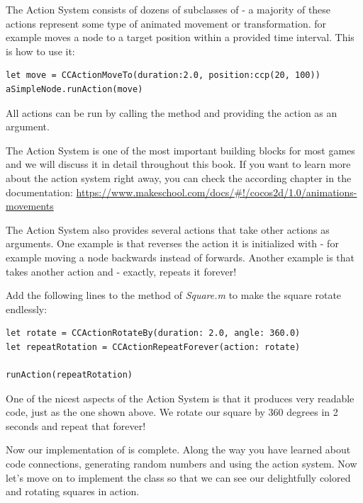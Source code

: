 The Action System consists of
dozens of subclasses of \inlinecode{\ccaction{}} - a majority of these actions represent some type of animated movement or
transformation.  for example moves a node to a
target position within a provided time interval. This is how to use it:
\begin{lstlisting}
let move = CCActionMoveTo(duration:2.0, position:ccp(20, 100))
aSimpleNode.runAction(move)
\end{lstlisting}
All actions can be run by calling the  method and
providing the action as an argument. 

\begin{details} The \cocos{} Action System is one of the most
important building blocks for most games and we will discuss it in detail
throughout this book. If you want to learn more about the \cocos{} action system
right away, you can check the according chapter in the \cocos{} documentation:
\url{https://www.makeschool.com/docs/#!/cocos2d/1.0/animations-movements}
\end{details}

The Action System also provides several actions that take other actions as
arguments. One example is  that reverses the action
it is initialized with - for example moving a node backwards instead of
forwards. Another example is  that takes
another action and - exactly, repeats it forever!

\begin{leftbar}
Add the following lines to the  method of \textit{Square.m}
to make the square rotate endlessly:
\begin{lstlisting}
let rotate = CCActionRotateBy(duration: 2.0, angle: 360.0)
let repeatRotation = CCActionRepeatForever(action: rotate)

runAction(repeatRotation)
\end{lstlisting}
\end{leftbar}
One of the nicest aspects of the Action System is that it produces very readable
code, just as the one shown above. We rotate our square by 360 degrees in 2
seconds and repeat that forever!

Now our implementation of  is complete. Along the way you
have learned about code connections, generating random numbers and using the
action system. Now let's move on to implement the  class so
that we can see our delightfully colored and rotating squares in action.

